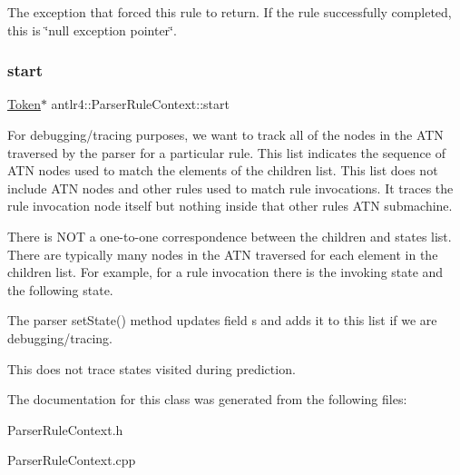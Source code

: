 The exception that forced this rule to return. If the rule successfully completed, this is \char`\"{}null exception pointer\char`\"{}. \mbox{\label{classantlr4_1_1ParserRuleContext_a2e3580cf80f49dc92cec0ad4c8ea9ba0}} 
\subsubsection{\texorpdfstring{start}{start}}
{\footnotesize\ttfamily \hyperlink{classantlr4_1_1Token}{Token}$\ast$ antlr4\+::\+Parser\+Rule\+Context\+::start}



For debugging/tracing purposes, we want to track all of the nodes in the A\+TN traversed by the parser for a particular rule. This list indicates the sequence of A\+TN nodes used to match the elements of the children list. This list does not include A\+TN nodes and other rules used to match rule invocations. It traces the rule invocation node itself but nothing inside that other rule\textquotesingle{}s A\+TN submachine. 

There is N\+OT a one-\/to-\/one correspondence between the children and states list. There are typically many nodes in the A\+TN traversed for each element in the children list. For example, for a rule invocation there is the invoking state and the following state.

The parser set\+State() method updates field s and adds it to this list if we are debugging/tracing.

This does not trace states visited during prediction. 

The documentation for this class was generated from the following files\+:\begin{DoxyCompactItemize}
\item 
Parser\+Rule\+Context.\+h\item 
Parser\+Rule\+Context.\+cpp\end{DoxyCompactItemize}
